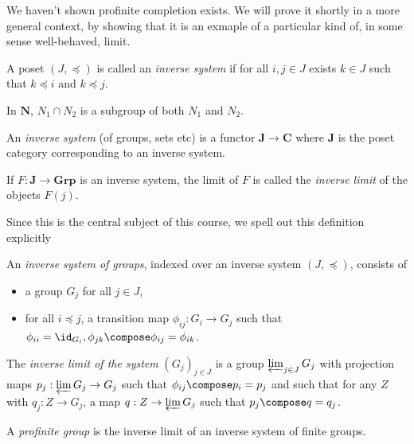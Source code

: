 \documentclass[a4paper]{article}
\renewcommand{\c}[1]{\mathbf{#1}} %
\begin{document}
We haven't shown profinite completion exists. We will prove it shortly in a more general context, by showing that it is an exmaple of a particular kind of, in some sense well-behaved, limit.

\begin{definition}
  A poset \((J, \preceq)\) is called an \emph{inverse system} if for all \(i, j \in J\) exists \(k \in J\) such that \(k \preceq i\) and \(k \preceq j\).
\end{definition}

\begin{eg}
  In \(\c{N}\), \(N_1 \cap N_2\) is a subgroup of both \(N_1\) and \(N_2\).
\end{eg}

\begin{definition}
  An \emph{inverse system} (of groups, sets etc) is a functor \(\c J \to \c C\) where \(\c J\) is the poset category corresponding to an inverse system.

  If \(F: \c J \to \c{Grp}\) is an inverse system, the limit of \(F\) is called the \emph{inverse limit} of the objects \(F(j)\).
\end{definition}

Since this is the central subject of this course, we spell out this definition explicitly

\begin{definition}
  An \emph{inverse system of groups}, indexed over an inverse system \((J, \preceq)\), consists of
  \begin{itemize}
  \item a group \(G_j\) for all \(j \in J\),
  \item for all \(i \preceq j\), a transition map \(\phi_{ij}: G_i \to G_j\) such that \(\phi_{ii} = \id_{G_i}, \phi_{jk} \compose \phi_{ij} = \phi_{ik}\).
  \end{itemize}
  The \emph{inverse limit of the system} \((G_j)_{j \in J}\) is a group \(\varprojlim_{j \in J} G_j\) with projection maps \(p_j: \varprojlim G_j \to G_j\) such that \(\phi_{ij} \compose p_i = p_j\) and such that for any \(Z\) with \(q_j: Z\to G_j\), a map \(q: Z \to \varprojlim G_j\) such that \(p_j \compose q = q_j\).
\end{definition}

\begin{definition}
  A \emph{profinite group} is the inverse limit of an inverse system of finite groups.
\end{definition}
\end{document}
